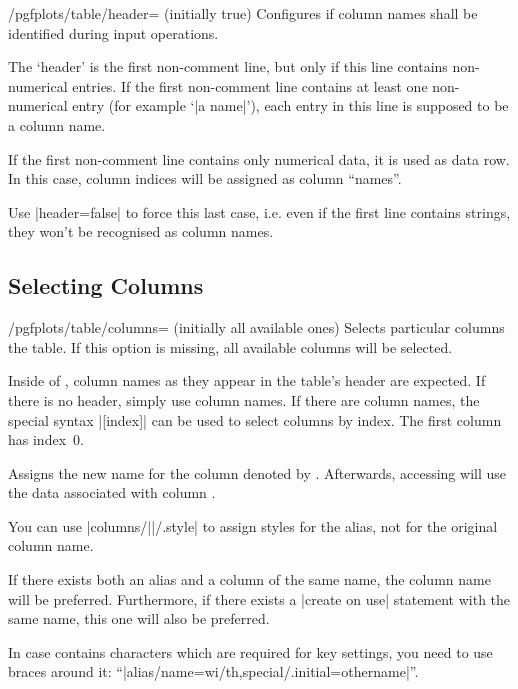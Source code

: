 \begin{key}{/pgfplots/table/header= (initially true)}
	Configures if column names shall be identified during input operations.

	The `header' is the first non-comment line, but only if this line contains non-numerical entries. If the first non-comment line contains at least one non-numerical entry (for example `|a name|'), each entry in this line is supposed to be a column name.

	If the first non-comment line contains only numerical data, it is used as data row. In this case, column indices will be assigned as column ``names''.

	Use |header=false| to force this last case, i.e. even if the first line contains strings, they won't be recognised as column names.
\end{key}

\subsection{Selecting Columns}
\begin{key}{/pgfplots/table/columns= (initially all available ones)}
	Selects particular columns the table. If this option is missing, all available columns will be selected.

	Inside of , column names as they appear in the table's header are expected. If there is no header, simply use column names. If there are column names, the special syntax |[index]| can be used to select columns by index. The first column has index~$0$.
\begin{codeexample}[]
\end{codeexample}
\end{key}

\begin{pgfplotstablealiaskey}
	Assigns the new name  for the column denoted by . Afterwards, accessing  will use the data associated with column .

	You can use |columns/||/.style| to assign styles for the alias, not for the original column name.

	If there exists both an alias and a column of the same name, the column name will be preferred. Furthermore, if there exists a |create on use| statement with the same name, this one will also be preferred.

	In case  contains characters which are required for key settings, you need to use braces around it: ``|alias/{name=wi/th,special}/.initial={othername}|''.
\end{pgfplotstablealiaskey}

